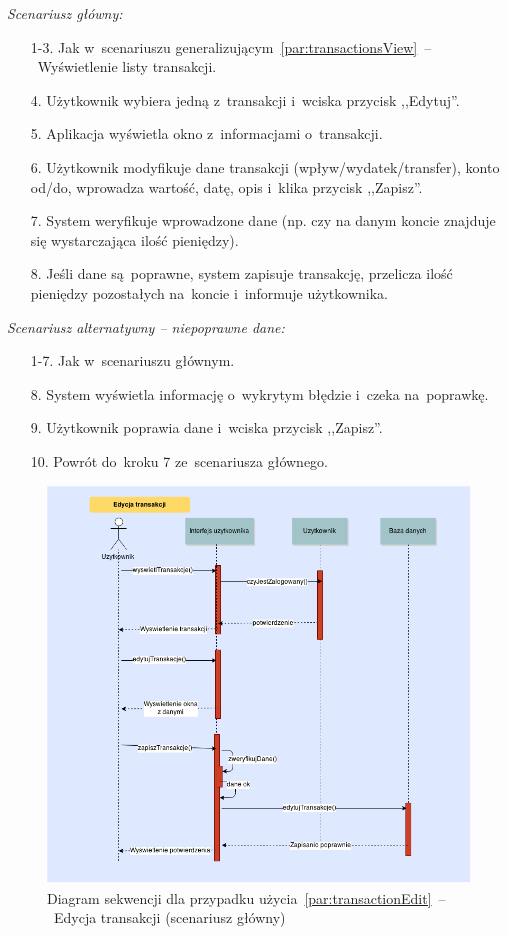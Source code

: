 \noindent \textit{Scenariusz główny:}
\begin{enumerate}
  \item[1-3.] Jak w~scenariuszu generalizującym~\ref{par:transactionsView}~--~Wyświetlenie listy transakcji.
  \item[4.] Użytkownik wybiera jedną z~transakcji i~wciska przycisk ,,Edytuj''.
  \item[5.] Aplikacja wyświetla okno z~informacjami o~transakcji.
  \item[6.] Użytkownik modyfikuje dane transakcji (wpływ/wydatek/transfer), konto od/do, wprowadza wartość, datę, opis i~klika przycisk ,,Zapisz''.
  \item[7.] System weryfikuje wprowadzone dane (np. czy na danym koncie znajduje się wystarczająca ilość pieniędzy).
  \item[8.] Jeśli dane są~poprawne, system zapisuje transakcję, przelicza ilość pieniędzy pozostałych na~koncie i~informuje użytkownika.
\end{enumerate}

\noindent \textit{Scenariusz alternatywny -- niepoprawne dane:}
\begin{enumerate}
  \item[1-7.] Jak w~scenariuszu głównym.
  \item[8.] System wyświetla informację o~wykrytym błędzie i~czeka na~poprawkę.
  \item[9.] Użytkownik poprawia dane i~wciska przycisk ,,Zapisz''.
  \item[10.] Powrót do~kroku 7 ze~scenariusza głównego.
\end{enumerate}

\begin{figure}[H]
  \includegraphics[width=\textwidth]{images/edycja_transakcji.png}
  \caption{Diagram sekwencji dla przypadku użycia~\ref{par:transactionEdit}~--~Edycja transakcji (scenariusz główny)}
\end{figure}

